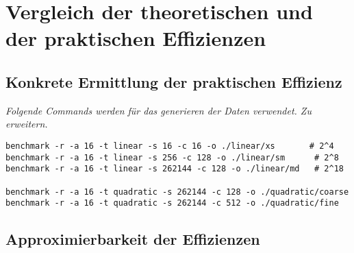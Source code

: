 \chapter{Vergleich der theoretischen und der praktischen Effizienzen}
\label{cha:vergleich}

\section{Konkrete Ermittlung der praktischen Effizienz}

\emph{Folgende Commands werden für das generieren der Daten verwendet. Zu erweitern.}

\begin{lstlisting}
benchmark -r -a 16 -t linear -s 16 -c 16 -o ./linear/xs       # 2^4
benchmark -r -a 16 -t linear -s 256 -c 128 -o ./linear/sm      # 2^8
benchmark -r -a 16 -t linear -s 262144 -c 128 -o ./linear/md   # 2^18

benchmark -r -a 16 -t quadratic -s 262144 -c 128 -o ./quadratic/coarse
benchmark -r -a 16 -t quadratic -s 262144 -c 512 -o ./quadratic/fine
\end{lstlisting}

\section{Approximierbarkeit der Effizienzen}


